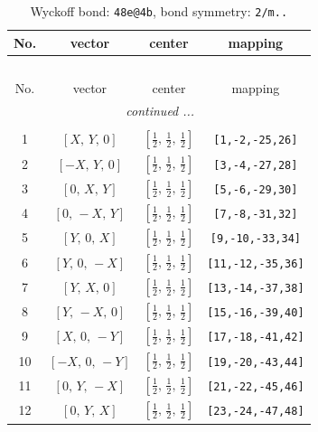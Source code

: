 \documentclass[fleqn,8pt]{jsarticle}
\begin{document}
\renewcommand{\arraystretch}{1.2}
\begin{longtable}{cccc}
\caption{Wyckoff bond: {\tt 48e@4b}, bond symmetry: {\tt 2/m..}}
 \\
 \hline \hline
No. & vector & center & mapping \\ \hline \endfirsthead

\multicolumn{3}{l}{\tablename\ \thetable{}} \\
 \hline \hline
No. & vector & center & mapping \\ \hline \endhead

 \hline \hline
\multicolumn{3}{r}{\footnotesize\it continued ...} \\ \endfoot

 \hline \hline
\multicolumn{3}{r}{} \\ \endlastfoot

1 & $\left[ X,\, Y,\, 0 \right]$ & $\left[ \frac{1}{2},\, \frac{1}{2},\, \frac{1}{2} \right]$ & {\tt [1,-2,-25,26]} \\ \hline
2 & $\left[ - X,\, Y,\, 0 \right]$ & $\left[ \frac{1}{2},\, \frac{1}{2},\, \frac{1}{2} \right]$ & {\tt [3,-4,-27,28]} \\ \hline
3 & $\left[ 0,\, X,\, Y \right]$ & $\left[ \frac{1}{2},\, \frac{1}{2},\, \frac{1}{2} \right]$ & {\tt [5,-6,-29,30]} \\ \hline
4 & $\left[ 0,\, - X,\, Y \right]$ & $\left[ \frac{1}{2},\, \frac{1}{2},\, \frac{1}{2} \right]$ & {\tt [7,-8,-31,32]} \\ \hline
5 & $\left[ Y,\, 0,\, X \right]$ & $\left[ \frac{1}{2},\, \frac{1}{2},\, \frac{1}{2} \right]$ & {\tt [9,-10,-33,34]} \\ \hline
6 & $\left[ Y,\, 0,\, - X \right]$ & $\left[ \frac{1}{2},\, \frac{1}{2},\, \frac{1}{2} \right]$ & {\tt [11,-12,-35,36]} \\ \hline
7 & $\left[ Y,\, X,\, 0 \right]$ & $\left[ \frac{1}{2},\, \frac{1}{2},\, \frac{1}{2} \right]$ & {\tt [13,-14,-37,38]} \\ \hline
8 & $\left[ Y,\, - X,\, 0 \right]$ & $\left[ \frac{1}{2},\, \frac{1}{2},\, \frac{1}{2} \right]$ & {\tt [15,-16,-39,40]} \\ \hline
9 & $\left[ X,\, 0,\, - Y \right]$ & $\left[ \frac{1}{2},\, \frac{1}{2},\, \frac{1}{2} \right]$ & {\tt [17,-18,-41,42]} \\ \hline
10 & $\left[ - X,\, 0,\, - Y \right]$ & $\left[ \frac{1}{2},\, \frac{1}{2},\, \frac{1}{2} \right]$ & {\tt [19,-20,-43,44]} \\ \hline
11 & $\left[ 0,\, Y,\, - X \right]$ & $\left[ \frac{1}{2},\, \frac{1}{2},\, \frac{1}{2} \right]$ & {\tt [21,-22,-45,46]} \\ \hline
12 & $\left[ 0,\, Y,\, X \right]$ & $\left[ \frac{1}{2},\, \frac{1}{2},\, \frac{1}{2} \right]$ & {\tt [23,-24,-47,48]} \\
\end{longtable}
\end{document}
